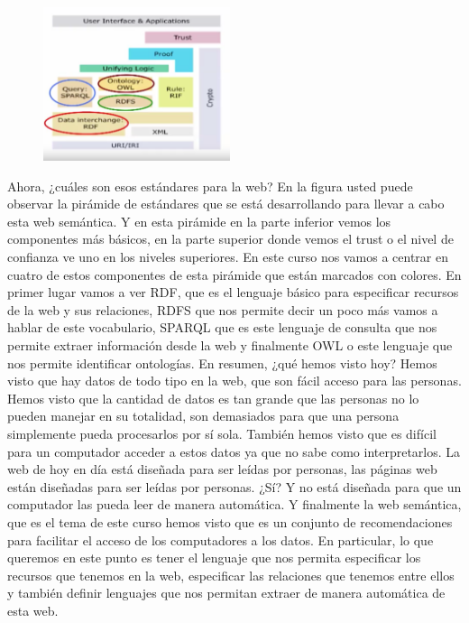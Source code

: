 \begin{figure}[H]
	\centering
	\includegraphics[height=4.5cm]{imagenes/capitulo3/9} %
	\caption{}
	\label{}
\end{figure}

Ahora, ¿cuáles son esos estándares para la web? En la figura usted puede observar la pirámide de estándares que se está desarrollando para llevar a cabo esta web semántica. Y en esta pirámide en la parte inferior vemos los componentes más básicos, en la parte superior donde vemos el trust o el nivel de confianza ve uno en los niveles superiores. En este curso nos vamos a centrar en cuatro de estos componentes de esta pirámide que están marcados con colores. En primer lugar vamos a ver RDF, que es el lenguaje básico para especificar recursos de la web y sus relaciones, RDFS que nos permite decir un poco más vamos a hablar de este vocabulario, SPARQL que es este lenguaje de consulta que nos permite extraer información desde la web y finalmente OWL o este lenguaje que nos permite identificar ontologías. En resumen, ¿qué hemos visto hoy? Hemos visto que hay datos de todo tipo en la web, que son fácil acceso para las personas. Hemos visto que la cantidad de datos es tan grande que las personas no lo pueden manejar en su totalidad, son demasiados para que una persona simplemente pueda procesarlos por sí sola. También hemos visto que es difícil para un computador acceder a estos datos ya que no sabe como interpretarlos. La web de hoy en día está diseñada para ser leídas por personas, las páginas web están diseñadas para ser leídas por personas. ¿Sí? Y no está diseñada para que un computador las pueda leer de manera automática. Y finalmente la web semántica, que es el tema de este curso hemos visto que es un conjunto de recomendaciones para facilitar el acceso de los computadores a los datos. En particular, lo que queremos en este punto es tener el lenguaje que nos permita especificar los recursos que tenemos en la web, especificar las relaciones que tenemos entre ellos y también definir lenguajes que nos permitan extraer de manera automática de esta web.

